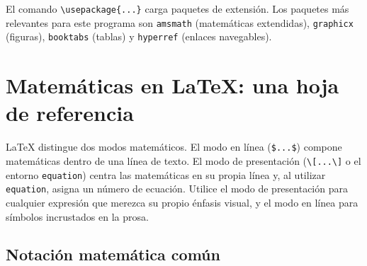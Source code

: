 El comando \verb|\usepackage{...}| carga paquetes de extensión. Los
paquetes más relevantes para este programa son \texttt{amsmath}
(matemáticas extendidas), \texttt{graphicx} (figuras),
\texttt{booktabs} (tablas) y \texttt{hyperref} (enlaces navegables).

\section{Matemáticas en \LaTeX{}: una hoja de referencia}
\label{sec:latex-math}

\LaTeX{} distingue dos modos matemáticos. El modo en línea
(\verb|$...$|) compone matemáticas dentro de una línea de texto. El
modo de presentación (\verb|\[...\]| o el entorno \texttt{equation})
centra las matemáticas en su propia línea y, al utilizar
\texttt{equation}, asigna un número de ecuación. Utilice el modo de
presentación para cualquier expresión que merezca su propio énfasis
visual, y el modo en línea para símbolos incrustados en la prosa.

\subsection{Notación matemática común}

